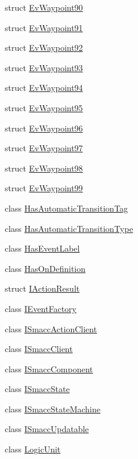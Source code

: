 \begin{DoxyCompactItemize}
struct \hyperlink{structsmacc_1_1EvWaypoint90}{Ev\+Waypoint90}
\item 
struct \hyperlink{structsmacc_1_1EvWaypoint91}{Ev\+Waypoint91}
\item 
struct \hyperlink{structsmacc_1_1EvWaypoint92}{Ev\+Waypoint92}
\item 
struct \hyperlink{structsmacc_1_1EvWaypoint93}{Ev\+Waypoint93}
\item 
struct \hyperlink{structsmacc_1_1EvWaypoint94}{Ev\+Waypoint94}
\item 
struct \hyperlink{structsmacc_1_1EvWaypoint95}{Ev\+Waypoint95}
\item 
struct \hyperlink{structsmacc_1_1EvWaypoint96}{Ev\+Waypoint96}
\item 
struct \hyperlink{structsmacc_1_1EvWaypoint97}{Ev\+Waypoint97}
\item 
struct \hyperlink{structsmacc_1_1EvWaypoint98}{Ev\+Waypoint98}
\item 
struct \hyperlink{structsmacc_1_1EvWaypoint99}{Ev\+Waypoint99}
\item 
class \hyperlink{classsmacc_1_1HasAutomaticTransitionTag}{Has\+Automatic\+Transition\+Tag}
\item 
class \hyperlink{classsmacc_1_1HasAutomaticTransitionType}{Has\+Automatic\+Transition\+Type}
\item 
class \hyperlink{classsmacc_1_1HasEventLabel}{Has\+Event\+Label}
\item 
class \hyperlink{classsmacc_1_1HasOnDefinition}{Has\+On\+Definition}
\item 
struct \hyperlink{structsmacc_1_1IActionResult}{I\+Action\+Result}
\item 
class \hyperlink{classsmacc_1_1IEventFactory}{I\+Event\+Factory}
\item 
class \hyperlink{classsmacc_1_1ISmaccActionClient}{I\+Smacc\+Action\+Client}
\item 
class \hyperlink{classsmacc_1_1ISmaccClient}{I\+Smacc\+Client}
\item 
class \hyperlink{classsmacc_1_1ISmaccComponent}{I\+Smacc\+Component}
\item 
class \hyperlink{classsmacc_1_1ISmaccState}{I\+Smacc\+State}
\item 
class \hyperlink{classsmacc_1_1ISmaccStateMachine}{I\+Smacc\+State\+Machine}
\item 
class \hyperlink{classsmacc_1_1ISmaccUpdatable}{I\+Smacc\+Updatable}
\item 
class \hyperlink{classsmacc_1_1LogicUnit}{Logic\+Unit}
\item 

\end{DoxyCompactItemize}
